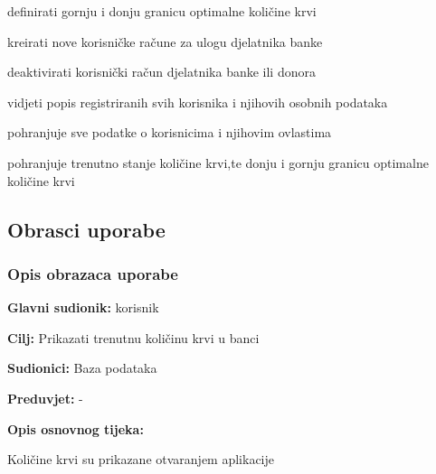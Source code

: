 \documentclass[11pt]{book}
\begin{document}
\begin{packed_enum}
\begin{packed_enum}
		\item definirati gornju i donju granicu optimalne količine krvi
		\item kreirati nove korisničke račune za ulogu djelatnika banke
		\item deaktivirati korisnički račun djelatnika banke ili donora
		\item vidjeti popis registriranih svih korisnika i njihovih osobnih podataka
		
	\end{packed_enum}
	
	\item  {}
	
	\begin{packed_enum}
		
		\item pohranjuje sve podatke o korisnicima i njihovim ovlastima
		\item pohranjuje trenutno stanje količine krvi,te donju i gornju granicu optimalne količine krvi
		
	\end{packed_enum}
\end{packed_enum}

\eject 



\subsection{Obrasci uporabe}

\subsubsection{Opis obrazaca uporabe}


\noindent {}
					\begin{packed_item}
	
						\item \textbf{Glavni sudionik: }korisnik
						\item \textbf{Cilj:} Prikazati trenutnu količinu krvi u banci
						\item \textbf{Sudionici:} Baza podataka
						\item \textbf{Preduvjet:} -
						\item \textbf{Opis osnovnog tijeka:}
						
						\item[] \begin{packed_enum}
	
							\item Količine krvi su prikazane otvaranjem aplikacije
							
						\end{packed_enum}

					\end{packed_item}
\end{document}
